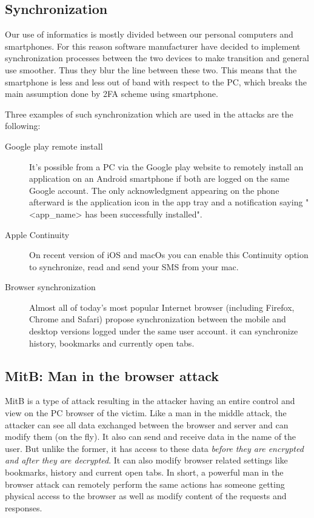 \documentclass[11pt, a4paper,twocolumn]{article}
\begin{document}
\subsection{Synchronization}
Our use of informatics is mostly divided between our personal computers and smartphones. For this reason software manufacturer have decided to implement synchronization processes between the two devices to make transition and general use smoother. Thus they blur the line between these two. This means that the smartphone is less and less out of band with respect to the PC, which breaks the main assumption done by 2FA scheme using smartphone.

Three examples of such synchronization which are used in the attacks are the following:
\begin{description}
  \item[Google play remote install] It's possible from a PC via the Google play website to remotely install an application on an Android smartphone if both are logged on the same Google account. The only acknowledgment appearing on the phone afterward is the application icon in the app tray and a notification saying "<app\_name> has been successfully installed".
  
  \item[Apple Continuity] On recent version of iOS and macOs you can enable this Continuity option to synchronize, read and send your SMS from your mac.
  
  \item[Browser synchronization] Almost all of today's most popular Internet browser (including Firefox, Chrome and Safari) propose synchronization between the mobile and desktop versions logged under the same user account. it can synchronize history, bookmarks and currently open tabs.
\end{description}
\subsection{MitB: Man in the browser attack}
MitB is a type of attack resulting in the attacker having an entire control and view on the PC browser of the victim. Like a man in the middle attack, the attacker can see all data 
exchanged between the browser and server and can modify them (on the fly). It also can send and receive data in the name of the user. But unlike the former, it has access to these data \emph{before they are encrypted and after they are decrypted}. It can also modify browser related settings like bookmarks, history and current open tabs. In short, a powerful man in the browser attack can remotely perform the same actions has someone getting physical access to the browser as well as modify content of the requests and responses.
\end{document}
